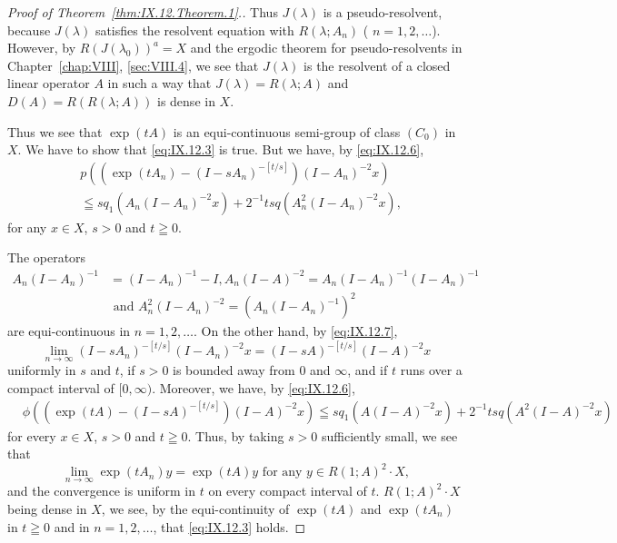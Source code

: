\begin{proof}[Proof of Theorem~\ref{thm:IX.12.Theorem.1}.]
Thus $J(\lambda)$ is a pseudo-resolvent, because $J(\lambda)$ satisfies the resolvent equation with $R(\lambda; A_n)$ ( $n = 1, 2, \ldots$). However, by $R(J(\lambda_0))^a = X$ and the ergodic theorem for pseudo-resolvents in Chapter~\ref{chap:VIII}, \ref{sec:VIII.4}, we see that $J(\lambda)$ is the resolvent of a closed linear operator $A$ in such a way that $J(\lambda) = R(\lambda; A)$ and $D(A) = R(R(\lambda; A))$ is dense in $X$. 

Thus we see that $\exp(tA)$ is an equi-continuous semi-group of class $(C_{0})$ in $X$. We have to show that \eqref{eq:IX.12.3} is true. But we have, by \eqref{eq:IX.12.6}, 
\[
\begin{aligned} & p \left((\exp (t A _{n}) - (I - s A _{n}) ^{-[t/s]}) (I - A _{n}) ^{-2} x\right) \\ & \leqq s q _{1} (A _{n} (I - A _{n}) ^{-2} x) + 2 ^{-1} t s q (A _{n} ^{2} (I - A _{n}) ^{-2} x), \end{aligned}
\]
for any $x \in X$, $s > 0$ and $t \geqq 0$. 

The operators 
\[
\begin{aligned} A _{n} (I - A _{n}) ^{-1} & = (I - A _{n}) ^{-1} - I, A _{n} (I - A) ^{-2} = A _{n} (I - A _{n}) ^{-1} (I - A _{n}) ^{-1} \\ & \text{ and } A _{n} ^{2} (I - A _{n}) ^{-2} = (A _{n} (I - A _{n}) ^{-1}) ^{2} \end{aligned}
\]
are equi-continuous in $n = 1,2,\ldots$. On the other hand, by \eqref{eq:IX.12.7}, 
\[
\lim\limits _{n \rightarrow \infty} (I - s A _{n}) ^{-[t/s]} (I - A _{n}) ^{-2} x = (I - s A) ^{-[t/s]} (I - A) ^{-2} x
\]
uniformly in $s$ and $t$, if $s > 0$ is bounded away from $0$ and $\infty$, and if $t$ runs over a compact interval of $[0, \infty)$. Moreover, we have, by \eqref{eq:IX.12.6}, 
\[
\begin{aligned}
&\phi \left((\exp (t A) - (I - s A) ^{-[t/s]}) (I - A) ^{-2} x\right) \leqq s q _{1} (A (I - A) ^{-2} x) + 2 ^{-1} t s q (A ^{2} (I - A) ^{-2} x)
\end{aligned}
\]
for every $x \in X$, $s > 0$ and $t \geqq 0$. Thus, by taking $s > 0$ sufficiently small, we see that 
\[
\lim\limits _{n \rightarrow \infty} \exp (t A _{n}) y = \exp (t A) y \text{ for any } y \in R (1; A) ^{2} \cdot X,
\]
and the convergence is uniform in $t$ on every compact interval of $t$. $R(1;A)^{2} \cdot X$ being dense in $X$, we see, by the equi-continuity of $\exp(tA)$ and $\exp(tA_{n})$ in $t \geqq 0$ and in $n = 1, 2, \ldots$, that \eqref{eq:IX.12.3} holds. 
\end{proof}

